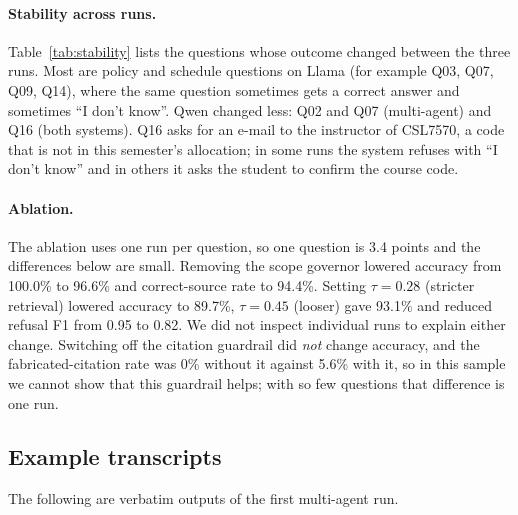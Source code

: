 \documentclass[11pt,a4paper]{article}
\begin{document}
\paragraph{Stability across runs.} Table~\ref{tab:stability} lists the questions whose outcome changed
between the three runs. Most are policy and schedule questions on Llama (for example Q03, Q07, Q09, Q14),
where the same question sometimes gets a correct answer and sometimes ``I don't know''. Qwen changed less:
Q02 and Q07 (multi-agent) and Q16 (both systems). Q16 asks for an e-mail to the instructor of CSL7570, a code
that is not in this semester's allocation; in some runs the system refuses with ``I don't know'' and in others it
asks the student to confirm the course code.

\paragraph{Ablation.} The ablation uses one run per question, so one question is 3.4 points and the
differences below are small. Removing the scope governor lowered accuracy from 100.0\% to 96.6\% and
correct-source rate to 94.4\%. Setting $\tau=0.28$ (stricter retrieval) lowered accuracy to 89.7\%, $\tau=0.45$ (looser)
gave 93.1\% and reduced refusal F1 from 0.95 to 0.82. We did not inspect individual runs to explain either change. Switching off the citation guardrail did
\emph{not} change accuracy, and the fabricated-citation rate was 0\% without it against 5.6\% with it, so
in this sample we cannot show that this guardrail helps; with so few questions that difference is one run.

\subsection{Example transcripts}
The following are verbatim outputs of the first multi-agent run.


\end{document}
